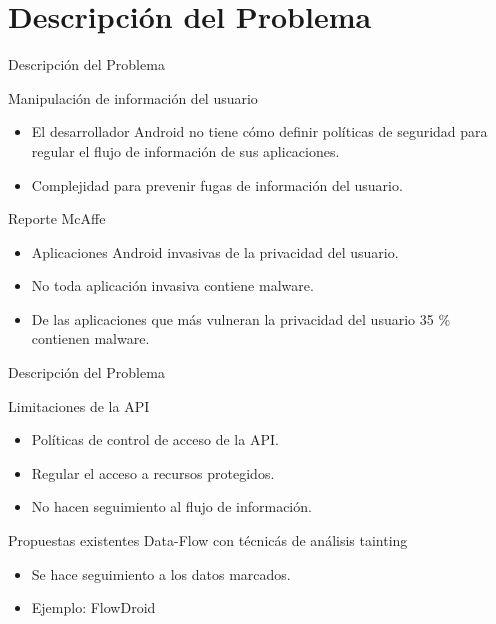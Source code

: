  \section{Descripción del Problema}
	
\begin{frame}{Descripción del Problema}
	\begin{block}{Manipulación de información del usuario}
	\begin{itemize}
	  \item El desarrollador Android no tiene cómo definir políticas de seguridad para
	regular el flujo de información de sus aplicaciones.
	\item Complejidad para prevenir fugas de información del usuario.
	\end{itemize}
	\end{block}
	\pause
	\begin{block}{ Reporte McAffe}
		\begin{itemize}
	  	\item Aplicaciones Android invasivas de la privacidad del usuario.
	  	\item No toda aplicación invasiva contiene malware.
	  	\item De las aplicaciones que más vulneran la privacidad del usuario 35 \%
	  	contienen malware.
		\end{itemize}
	\end{block}
\end{frame}

\begin{frame}{Descripción del Problema}
\begin{block}{Limitaciones de la API}
\begin{itemize}
  \item Políticas de control de acceso de la API.
  \item Regular el acceso a recursos protegidos.
  \item No hacen seguimiento al flujo de información.
\end{itemize}
\end{block}
\pause
\begin{block}{Propuestas existentes}
Data-Flow con técnicás de análisis tainting\newline
\begin{itemize}
	  \item  Se hace seguimiento a los datos marcados.
	  \item Ejemplo: FlowDroid
\end{itemize}	
\end{block}
\end{frame}

